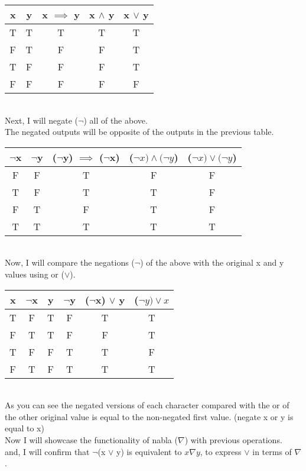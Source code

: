 \documentclass[10pt, AMS Euler]{article}
\begin{document}
\begin{enumerate}
\begin{tabular}{|c|c|c|c|c|}
              \hline
              x& y& x $\implies$ y& x $\wedge$ y&x $\vee$ y\\
              \hline
              T& T& T& T&T\\
              \hline
              F& T& F& F&T\\
              \hline
 T& F& F& F&T\\\hline
 F& F& F& F&F\\\hline
            \end{tabular}
\\Next, I will negate ($\neg$) all of the above. 
\\ The negated outputs will be opposite of the outputs in the previous table.
\begin{tabular}{|c|c|c|c|c|}
              \hline
              $\neg$x& $\neg$y& ($\neg$y) $\implies$ ($\neg$x)& ($\neg x) \wedge (\neg y$)&($\neg x) \vee (\neg y$)\\
              \hline
              F& F& T& F&F\\
              \hline
              T& F& T& T&F\\
              \hline
 F& T& F& T&F\\\hline
 T& T& T& T&T\\\hline
            \end{tabular}
\\Now, I will compare the negations ($\neg$) of the above with the original x and y values using or ($\vee$).
\\\begin{tabular}{|c||c|c|c|c|c|}
              \hline
               x&$\neg$x&  y&$\neg$y& ($\neg$x) $\vee$ y& ($\neg y) \vee x$\\
              \hline
               T&F&  T&F& T& T\\
              \hline
               F&T&  T&F& F& T\\
              \hline
  T&F&  F&T& T& F\\\hline
  F&T&  F&T& T& T\\\hline
            \end{tabular}
\\ As you can see the negated versions of each character compared with the or of the other original value is equal to the non-negated first value. (negate x or y is equal to x)
\\Now I will showcase the functionality of nabla ($\nabla$) with previous operations. 
\\ and, I will confirm that  $\neg$(x $\vee$ y) is equivalent to $x \nabla y$, to express $\vee$ in terms of $\nabla$.

\end{enumerate}
\end{document}

